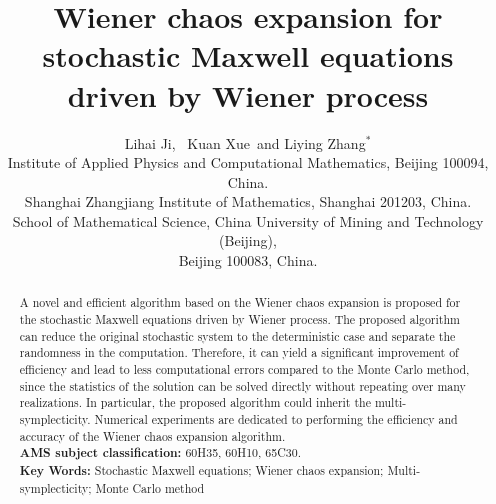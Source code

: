\documentclass[preprint,12pt]{article}
\numberwithin{figure}{section}
\numberwithin{table}{section}
\numberwithin{equation}{section}
\begin{document}
\title{Wiener chaos expansion for stochastic Maxwell equations driven by Wiener process}
 \author{
        Lihai Ji\footnotemark[2] \footnotemark[3], ~Kuan Xue\footnotemark[4] ~and Liying Zhang$^{\ast}$\footnotemark[4]\\
         {\small \footnotemark[2] Institute of Applied Physics and Computational Mathematics, Beijing 100094, China.} \\
         {\small \footnotemark[3] Shanghai Zhangjiang Institute of Mathematics, Shanghai 201203, China.}\\ 
          {\small \footnotemark[4] School of Mathematical Science, China University of Mining and Technology (Beijing),}\\
         {\small Beijing 100083, China.}
         }
       \maketitle

\begin{abstract}
 A novel and efficient algorithm based on the Wiener chaos expansion is proposed for the stochastic Maxwell equations driven by Wiener process. The proposed algorithm can reduce the original stochastic system to the deterministic case and separate the randomness in the computation. Therefore, it can yield a significant improvement of efficiency and lead to less computational errors compared to the Monte Carlo method, since the statistics of the solution can be solved directly without repeating over many realizations. In particular, the proposed algorithm could inherit the multi-symplecticity. Numerical experiments are dedicated to performing the efficiency and accuracy of the Wiener chaos expansion algorithm.\\

\textbf{AMS subject classification: } {60H35, 60H10, 65C30.}\\

\textbf{Key Words: }{\rm\small}Stochastic Maxwell equations; Wiener chaos expansion; Multi-symplecticity; Monte Carlo method
\end{abstract}
	
\end{document}
